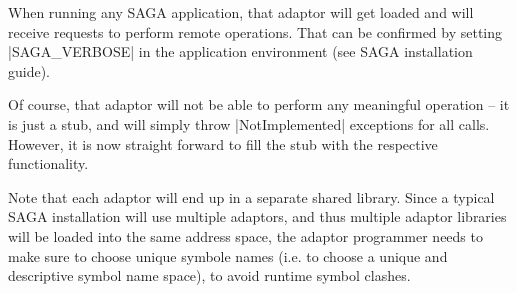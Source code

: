   When running any SAGA application, that adaptor will get loaded and
  will receive requests to perform remote operations.  That can be
  confirmed by setting |SAGA_VERBOSE| in the application environment
  (see SAGA installation guide).

  Of course, that adaptor will not be able to perform any meaningful
  operation -- it is just a stub, and will simply throw
  |NotImplemented| exceptions for all calls.  However, it is now
  straight forward to fill the stub with the respective functionality.  


  Note that each adaptor will end up in a separate shared library.
  Since a typical SAGA installation will use multiple adaptors, and
  thus multiple adaptor libraries will be loaded into the same address
  space, the adaptor programmer needs to make sure to choose unique
  symbole names (i.e. to choose a unique and descriptive symbol name
  space), to avoid runtime symbol clashes.

